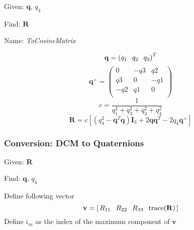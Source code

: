 Given:  $\mathbf{q}$, $q_4$

\noindent Find:  $\mathbf{R}$

\noindent Name:  \emph{ToCosineMatrix}

\begin{equation}
    \mathbf{q} = \left( q_1 \hspace{.1 in} q_2 \hspace{.1 in} q_3 \right)^T
\end{equation}
%
\begin{equation}
     \mathbf{q}^{\times} = \begin{pmatrix}
     0 & -q3 & q2\\
     q3 & 0 & -q1\\
     -q2 & q1 & 0\\
     \end{pmatrix}
\end{equation}
%
\begin{equation}
    c = \frac{1}{q_1^2 + q_2^2 + q_3^2 + q_4^2}
\end{equation}
%
\begin{equation}
     \mathbf{R} = c\left[ (q_4^2 - \mathbf{q}^T\mathbf{q})\mathbf{I}_3 +
      2\mathbf{q}\mathbf{q}^T -2q_4\mathbf{q}^{\times}\right]
\end{equation}


\subsubsection{Conversion:  DCM to Quaternions} \label{sec:DCMtoQuat}

Given:  $\mathbf{R}$

\noindent Find: $\mathbf{q}$, $q_4$

Define following vector
%
\begin{equation}
   \mathbf{v} = [ \hspace{.02 in} R_{11} \hspace{.1 in} R_{22}\hspace{.1 in}
   R_{33} \hspace{.1 in}  \mbox{trace}(\mathbf{R}) \hspace{.02 in}]
\end{equation}
%
Define $i_m$ as the index of the maximum component of $\mathbf{v}$
%

